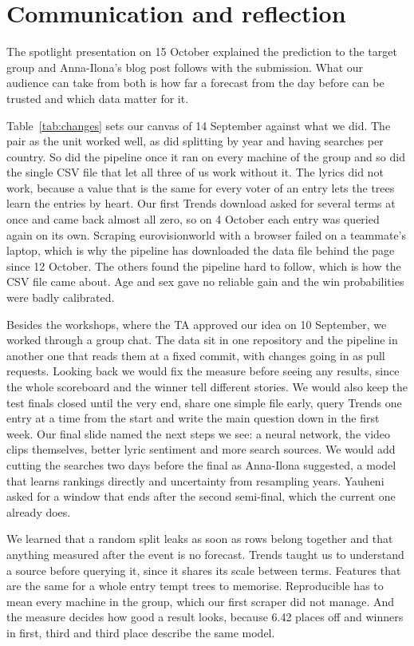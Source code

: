 \section{Communication and reflection}

The spotlight presentation on 15 October explained the prediction to the target group and Anna-Ilona's blog post follows with the submission. What our audience can take from both is how far a forecast from the day before can be trusted and which data matter for it.



Table~\ref{tab:changes} sets our canvas of 14 September against what we did. The pair as the unit worked well, as did splitting by year and having searches per country. So did the pipeline once it ran on every machine of the group and so did the single CSV file that let all three of us work without it. The lyrics did not work, because a value that is the same for every voter of an entry lets the trees learn the entries by heart. Our first Trends download asked for several terms at once and came back almost all zero, so on 4 October each entry was queried again on its own. Scraping eurovisionworld with a browser failed on a teammate's laptop, which is why the pipeline has downloaded the data file behind the page since 12 October. The others found the pipeline hard to follow, which is how the CSV file came about. Age and sex gave no reliable gain and the win probabilities were badly calibrated.

Besides the workshops, where the TA approved our idea on 10 September, we worked through a group chat. The data sit in one repository and the pipeline in another one that reads them at a fixed commit, with changes going in as pull requests. Looking back we would fix the measure before seeing any results, since the whole scoreboard and the winner tell different stories. We would also keep the test finals closed until the very end, share one simple file early, query Trends one entry at a time from the start and write the main question down in the first week. Our final slide named the next steps we see: a neural network, the video clips themselves, better lyric sentiment and more search sources. We would add cutting the searches two days before the final as Anna-Ilona suggested, a model that learns rankings directly and uncertainty from resampling years. Yauheni asked for a window that ends after the second semi-final, which the current one already does.

We learned that a random split leaks as soon as rows belong together and that anything measured after the event is no forecast. Trends taught us to understand a source before querying it, since it shares its scale between terms. Features that are the same for a whole entry tempt trees to memorise. Reproducible has to mean every machine in the group, which our first scraper did not manage. And the measure decides how good a result looks, because 6.42 places off and winners in first, third and third place describe the same model.

